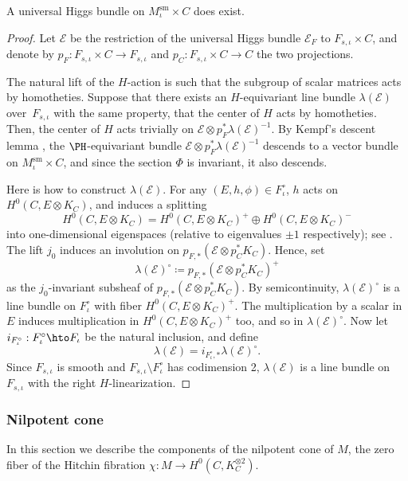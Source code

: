 \begin{prop}
A universal Higgs bundle on $M^{\mathrm{sm}}_{\iota} \times C$ does exist.
\end{prop}
\begin{proof}

Let $\mathcal{E}$ be the restriction of the universal Higgs bundle $\mathcal{E}_F$ to $F_{s, \iota} \times C$, and denote by $p_F\colon F_{s, \iota} \times C\to F_{s, \iota}$ and $p_C\colon F_{s, \iota} \times C\to C$ the two projections.

The natural lift of the $H$-action is such that the subgroup of scalar matrices acts by homotheties. Suppose that there exists an $H$-equivariant line bundle $\lambda(\mathcal{E})$ over~$F_{s,\iota}$ with the same property, \ie that the center of $H$ acts by homotheties. Then, the center of $H$ acts trivially on $\mathcal{E} \otimes p_F^*\lambda(\mathcal{E})^{-1}$. By Kempf's descent lemma \cite[Th.\,2.3]{DN89}, the $\PH$-equivariant bundle $\mathcal{E} \otimes p_F^*\lambda(\mathcal{E})^{-1}$ descends to a vector bundle on $M^{\mathrm{sm}}_{\iota} \times C$, and since the section $\Phi$ is invariant, it also descends.

Here is how to construct $\lambda(\mathcal{E})$. For any $(E, h, \phi) \in F^{\circ}_{\iota}$, $h$ acts on $H^{0}(C, E \otimes K_C)$, and induces a splitting
\[
H^{0}(C, E \otimes K_C)= H^0(C, E \otimes K_C)^{+} \oplus H^0(C, E \otimes K_C)^{-}
\]
into one-dimensional eigenspaces (relative to eigenvalues $\pm 1$ respectively); see \cite[Prop.\,4.1]{HeuLoray19}. The lift $j_0$ induces an involution on $p_{F, *}(\mathcal{E} \otimes p^*_C K_C)$. Hence, set
\[
\lambda(\mathcal{E})^{\circ}\coloneqq p_{F, *}(\mathcal{E} \otimes p^*_C K_C)^{+}
\]
as the $j_0$-invariant subsheaf of $p_{F, *}(\mathcal{E} \otimes p^*_C K_C)$.
By semicontinuity, $\lambda(\mathcal{E})^{\circ}$ is a line bundle on $F^{\circ}_{ \iota}$ with fiber $H^0(C, E \otimes K_C)^{+}$. The multiplication by a scalar in $E$ induces multiplication in $H^0(C, E \otimes K_C)^{+}$ too, and so in $\lambda(\mathcal{E})^{\circ}$. Now let $i_{F^{\circ}_{\iota}}: F^{\circ}_{\iota} \hto F_{\iota}$ be the natural inclusion, and define
\[
\lambda(\mathcal{E})= i_{F^{\circ}_{\iota}, *} \lambda(\mathcal{E})^{\circ}.
\]
Since $F_{s, \iota}$ is smooth and $F_{s, \iota} \setminus F^{\circ}_{\iota}$ has codimension 2, $\lambda(\mathcal{E})$ is a line bundle on $F_{s, \iota}$ with the right $H$-linearization.
\end{proof}

\subsubsection{Nilpotent cone}\label{sec:nilpotent}
In this section we describe the components of the nilpotent cone of $M$, \ie the zero fiber of the Hitchin fibration $\chi\colon M \to H^0(C, K_C^{\otimes 2})$.

